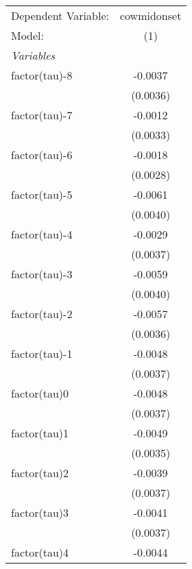 \begingroup
\centering
\begin{tabular}{lc}
   \tabularnewline \midrule \midrule
   Dependent Variable:             & cowmidonset\\  
   Model:                          & (1)\\  
   \midrule
   \emph{Variables}\\
   factor(tau)-8                   & -0.0037\\   
                                   & (0.0036)\\   
   factor(tau)-7                   & -0.0012\\   
                                   & (0.0033)\\   
   factor(tau)-6                   & -0.0018\\   
                                   & (0.0028)\\   
   factor(tau)-5                   & -0.0061\\   
                                   & (0.0040)\\   
   factor(tau)-4                   & -0.0029\\   
                                   & (0.0037)\\   
   factor(tau)-3                   & -0.0059\\   
                                   & (0.0040)\\   
   factor(tau)-2                   & -0.0057\\   
                                   & (0.0036)\\   
   factor(tau)-1                   & -0.0048\\   
                                   & (0.0037)\\   
   factor(tau)0                    & -0.0048\\   
                                   & (0.0037)\\   
   factor(tau)1                    & -0.0049\\   
                                   & (0.0035)\\   
   factor(tau)2                    & -0.0039\\   
                                   & (0.0037)\\   
   factor(tau)3                    & -0.0041\\   
                                   & (0.0037)\\   
   factor(tau)4                    & -0.0044\\   

\end{tabular}

